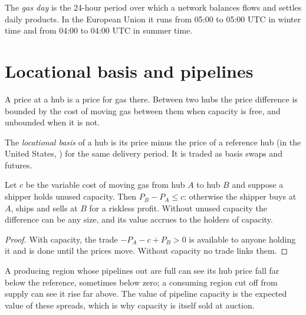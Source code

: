 \begin{definition}\label{def:m3:natural-gas-and-lng:gasday}
The \emph{gas day} is the 24-hour period over which a network balances
flows and settles daily products. In the European Union it runs from 05:00 to 05:00
UTC in winter time and from 04:00 to 04:00 UTC in summer time.
\end{definition}

\section{Locational basis and pipelines}

A price at a hub is a price for gas there. Between two hubs the price difference
is bounded by the cost of moving gas between them when capacity is free, and
unbounded when it is not.

\begin{definition}\label{def:m3:natural-gas-and-lng:basis}
The \emph{locational basis} of a hub is its price minus the
price of a reference hub (in the United States, ) for the same delivery
period. It is traded as basis swaps and futures.
\end{definition}

\begin{proposition}\label{prop:m3:natural-gas-and-lng:basis}
Let $c$ be the variable cost of moving gas from hub $A$ to hub $B$ and suppose a
shipper holds unused capacity. Then $P_B - P_A \le c$: otherwise the shipper buys at
$A$, ships and sells at $B$ for a riskless profit. Without unused capacity the
difference can be any size, and its value accrues to the holders of capacity.
\end{proposition}

\begin{proof}
With capacity, the trade $-P_A - c + P_B > 0$ is available to anyone holding it and
is done until the prices move. Without capacity no trade links them.
\end{proof}

A producing region whose pipelines out are full can see its hub price fall far below
the reference, sometimes below zero; a consuming region cut off from supply can see
it rise far above. The value of pipeline capacity is the expected value of these
spreads, which is why capacity is itself sold at auction.

